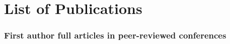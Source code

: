 \newcommand\resource[2]{
\noindent #1 \par
\vspace{0.2em}
{\centering	\url{#2} \par}
\vspace{0.5em}
\hrule \par 
\vspace{0.8em} \par}
%

\chapter[List of Publications][List of Publications]{List of Publications}\label{app:mypapers}%

\subsection*{First author full articles in peer-reviewed conferences}
